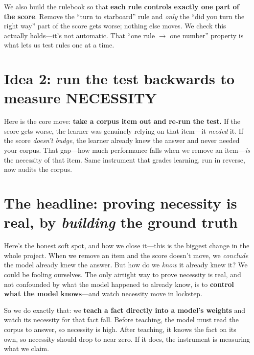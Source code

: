 \documentclass[11pt]{article}
\begin{document}
We also build the rulebook so that \textbf{each rule controls exactly one part of the score}.
Remove the ``turn to starboard'' rule and \emph{only} the ``did you turn the right way'' part of
the score gets worse; nothing else moves. We check this actually holds---it's not automatic. That
``one rule $\to$ one number'' property is what lets us test rules one at a time.

\section*{Idea 2: run the test backwards to measure NECESSITY}

Here is the core move: \textbf{take a corpus item out and re-run the test.} If the score gets
worse, the learner was genuinely relying on that item---it \emph{needed} it. If the score
\emph{doesn't budge}, the learner already knew the answer and never needed your corpus. That
gap---how much performance falls when we remove an item---\emph{is} the necessity of that item.
Same instrument that grades learning, run in reverse, now audits the corpus.

\section*{The headline: proving necessity is real, by \emph{building} the ground truth}

Here's the honest soft spot, and how we close it---this is the biggest change in the whole
project. When we remove an item and the score doesn't move, we \emph{conclude} the model already
knew the answer. But how do we \emph{know} it already knew it? We could be fooling ourselves. The
only airtight way to prove necessity is real, and not confounded by what the model happened to
already know, is to \textbf{control what the model knows}---and watch necessity move in lockstep.

So we do exactly that: we \textbf{teach a fact directly into a model's weights} and watch its
necessity for that fact fall. Before teaching, the model must read the corpus to answer, so
necessity is high. After teaching, it knows the fact on its own, so necessity should drop to
near zero. If it does, the instrument is measuring what we claim.
\end{document}

